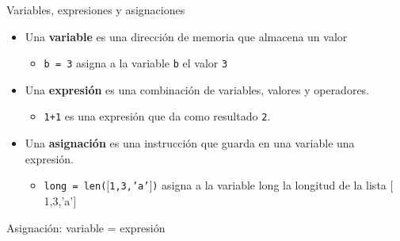 \documentclass{beamer}
\begin{document}
\begin{frame}{Variables, expresiones y asignaciones} \pause
\begin{itemize}
	\item Una \textbf{variable} es una dirección de memoria que almacena un valor\pause
		\begin{itemize}
		\item \texttt{b = 3} asigna a la variable \texttt{b} el valor \texttt{3}\pause
		\end{itemize}
	\item Una \textbf{expresión} es una combinación de variables, valores y operadores.\pause
		\begin{itemize}
		\item \texttt{1+1} es una expresión que da como resultado \texttt{2}.\pause
		\end{itemize}
	\item Una \textbf{asignación} es una instrucción que guarda en una variable una expresión.\pause
		\begin{itemize}
		\item \texttt{long = len($[$1,3,'a'$]$)} asigna a la variable long la longitud de la lista $[$1,3,'a'$]$ \pause
		\end{itemize}
\end{itemize}
\alert{Asignación: variable = expresión}
\end{frame}

\end{document}
